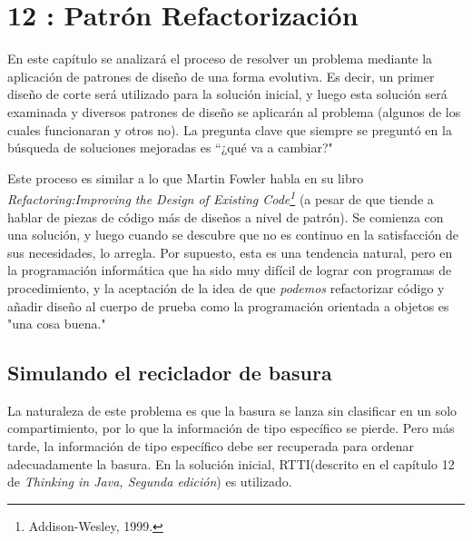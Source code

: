 
\section*{12 : Patrón Refactorización}
\label{sec:pr}


En este capítulo se analizará el proceso de resolver un problema mediante la aplicación de patrones de diseño de una forma evolutiva. Es decir, un primer diseño de corte será utilizado para la solución inicial, y luego esta solución será examinada y diversos patrones de diseño se aplicarán al problema (algunos de los cuales funcionaran y otros no). La pregunta clave que siempre se preguntó en la búsqueda de soluciones mejoradas es “¿qué va a cambiar?"     \newline

Este proceso es similar a lo que Martin Fowler habla en su libro \textit{Refactoring:Improving the Design of Existing Code\footnote{Addison-Wesley, 1999.}} (a pesar de que tiende a hablar de piezas de código más de diseños a nivel de patrón). 
Se comienza con una solución, y luego cuando se descubre que no es continuo en la satisfacción de sus necesidades, lo arregla. 
Por supuesto, esta es una tendencia natural, pero en la programación informática que ha sido muy difícil de lograr con programas de procedimiento, y la aceptación de la idea de que \textit{podemos} refactorizar código y añadir diseño al cuerpo de prueba como la programación orientada a objetos es "una cosa buena." \newline



\subsection*{Simulando el reciclador de basura}
\label{subsec:serdb}

La naturaleza de este problema es que la basura se lanza sin clasificar en un solo compartimiento, por lo que la información de tipo específico se pierde. Pero más tarde, la información de tipo específico debe ser recuperada para ordenar adecuadamente la basura. En la solución inicial, RTTI(descrito en el capítulo 12 de \textit{Thinking in Java, Segunda edición}) es utilizado.    \newline

